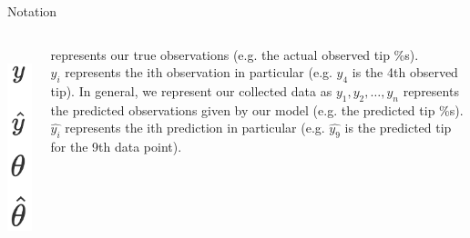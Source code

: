 \documentclass[aspectratio=169]{../latex_main/tntbeamer}  %
\begin{document}
	
	\begin{frame}{Notation}
	    \begin{columns}
	        \begin{column}{.1\textwidth}
	                \\
	                \includegraphics[scale=.43]{Bild19}
	        \end{column}
	        
	        
	        
	        \begin{column}{.9\textwidth}
	                represents our true observations (e.g. the actual observed tip \%s).\\
	                $y_i$ represents the ith observation in particular (e.g.   $y_4$  is the 4th observed tip). 
                    In general, we represent our collected data as    $y_1, y_2, \dots, y_n$               
                    \bigskip
                    represents the predicted observations given by our model (e.g. the predicted tip \%s).\\
                    $\hat{y_i}$ represents the ith prediction in particular (e.g.   $\hat{y_9}$     is the predicted tip for the 9th data point). 
                    

\end{column}
\end{columns}
\end{frame}
\end{document}
